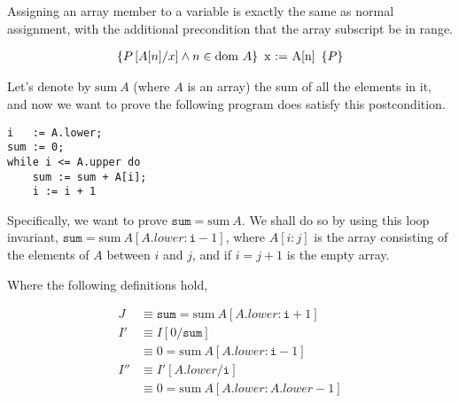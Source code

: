 \begin{definition}
  Assigning an array member to a variable is exactly the same as
  normal assignment, with the additional precondition that the array
  subscript be in range.

  \begin{align*}
    \htriple{P\left[A[n]/x\right] \land n \in \dom~A}{x := A[n]}{P}
  \end{align*}
\end{definition}

\begin{example}
  \label{exmpl:heap-sum}
  
  Let's denote by $\mathrm{sum}~A$ (where $A$ is an array) the sum of
  all the elements in it, and now we want to prove the following
  program does satisfy this postcondition.

\begin{verbatim}
i   := A.lower;
sum := 0;
while i <= A.upper do
    sum := sum + A[i];
    i := i + 1
\end{verbatim}

  Specifically, we want to prove $\mathtt{sum} = \mathrm{sum}~A$. We
  shall do so by using this loop invariant, $\mathtt{sum} =
  \mathrm{sum}~A[A.lower : \mathtt{i} - 1]$, where $A[i:j]$ is the
  array consisting of the elements of $A$ between $i$ and $j$, and if
  $i = j + 1$ is the empty array.

  \begin{prooftree}




  \end{prooftree}

  Where the following definitions hold,

  \begin{align*}
    J &\equiv \mathtt{sum} = \mathrm{sum}~A[A.lower : \mathtt{i} + 1]\\
    I' &\equiv I[0/\mathtt{sum}]\\
    &\equiv 0 = \mathrm{sum}~A[A.lower : \mathtt{i} - 1]\\
    I'' &\equiv I'[A.lower/\mathtt{i}]\\
    &\equiv 0 = \mathrm{sum}~A[A.lower : A.lower - 1]
  \end{align*}
\end{example}

